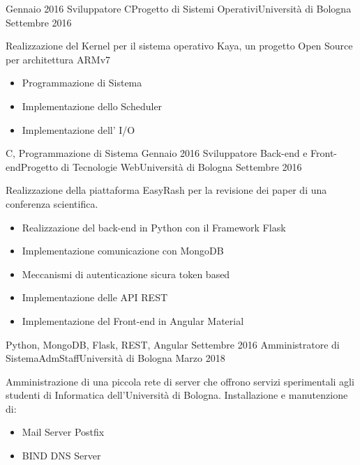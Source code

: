 \begin{experiences}
  \experience
    {Gennaio 2016}   {Sviluppatore C}{Progetto di Sistemi Operativi}{Universit\`a di Bologna}
    {Settembre 2016} {
                      Realizzazione del Kernel per il sistema operativo Kaya, un progetto Open Source per architettura ARMv7
                      \begin{itemize}
                        \item Programmazione di Sistema
                        \item Implementazione dello Scheduler
                        \item Implementazione dell' I/O
                      \end{itemize}
                    }
                    {C, Programmazione di Sistema}
  \emptySeparator
  \experience
    {Gennaio 2016}   {Sviluppatore Back-end e Front-end}{Progetto di Tecnologie Web}{Universit\`a di Bologna}
    {Settembre 2016} {
                      Realizzazione della piattaforma EasyRash per la revisione dei paper di una conferenza scientifica.
                      \begin{itemize}
                        \item Realizzazione del back-end in Python con il Framework Flask
                        \item Implementazione comunicazione con MongoDB
                        \item Meccanismi di autenticazione sicura token based
                        \item Implementazione delle API REST
                        \item Implementazione del Front-end in Angular Material
                      \end{itemize}
                    }
                    {Python, MongoDB, Flask, REST, Angular}
  \emptySeparator
  \experience
    {Settembre 2016}   {Amministratore di Sistema}{AdmStaff}{Universit\`a di Bologna}
    {Marzo 2018} {
                      Amministrazione di una piccola rete di server che offrono servizi sperimentali agli
                      studenti di Informatica dell'Universit\`a di Bologna.
                      Installazione e manutenzione di:
                      \begin{itemize}
                        \item Mail Server Postfix
                        \item BIND DNS Server

\end{itemize}}
\end{experiences}
